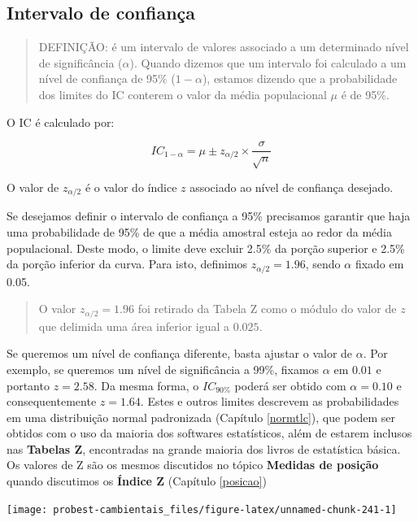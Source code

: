 \documentclass[
]{book}
\begin{document}
\hypertarget{intervalo-de-confianuxe7a}{%
\subsection{Intervalo de confiança}\label{intervalo-de-confianuxe7a}}

\begin{quote}
DEFINIÇÃO: é um intervalo de valores associado a um determinado nível de significância (\(\alpha\)). Quando dizemos que um intervalo foi calculado a um nível de confiança de 95\% (\(1 - \alpha\)), estamos dizendo que a probabilidade dos limites do IC conterem o valor da média populacional \(\mu\) é de 95\%.
\end{quote}

O IC é calculado por:

\[IC_{1-\alpha} = \mu \pm z_{\alpha/2} \times \frac{\sigma}{\sqrt{n}}\]

O valor de \(z_{\alpha/2}\) é o valor do índice \(z\) associado ao nível de confiança desejado.

Se desejamos definir o intervalo de confiança a 95\% precisamos garantir que haja uma probabilidade de 95\% de que a média amostral esteja ao redor da média populacional. Deste modo, o limite deve excluir 2.5\% da porção superior e 2.5\% da porção inferior da curva. Para isto, definimos \(z_{\alpha/2} = 1.96\), sendo \(\alpha\) fixado em 0.05.

\begin{quote}
O valor \(z_{\alpha/2} = 1.96\) foi retirado da Tabela Z como o módulo do valor de \(z\) que delimida uma área inferior igual a \(0.025\).
\end{quote}

Se queremos um nível de confiança diferente, basta ajustar o valor de \(\alpha\). Por exemplo, se queremos um nível de significância a 99\%, fixamos \(\alpha\) em \(0.01\) e portanto \(z = 2.58\). Da mesma forma, o \(IC_{90\%}\) poderá ser obtido com \(\alpha = 0.10\) e consequentemente \(z = 1.64\). Estes e outros limites descrevem as probabilidades em uma distribuição normal padronizada (Capítulo \ref{normtlc}), que podem ser obtidos com o uso da maioria dos softwares estatísticos, além de estarem inclusos nas \textbf{Tabelas Z}, encontradas na grande maioria dos livros de estatística básica. Os valores de Z são os mesmos discutidos no tópico \textbf{Medidas de posição} quando discutimos os \textbf{Índice Z} (Capítulo \ref{posicao})

\begin{center}\texttt{[image: probest-cambientais\_files/figure-latex/unnamed-chunk-241-1]} \end{center}
\end{document}
